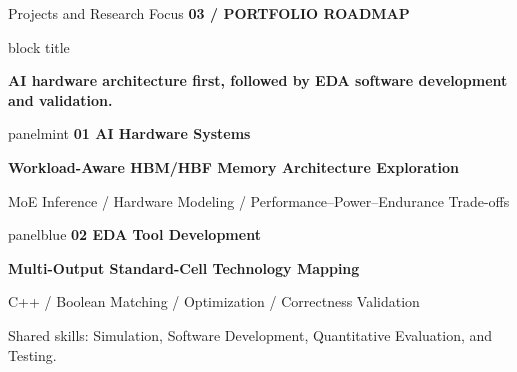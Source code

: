\documentclass[aspectratio=169,10pt]{beamer}
\newcommand{\smalllabel}[1]{{\scriptsize\bfseries\color{Accent}\MakeUppercase{#1}}}
\newcommand{\takeaway}[1]{%
  \begin{beamercolorbox}[rounded=true,sep=0.15cm,wd=\linewidth]{block title}%
    \strut\textbf{#1}\strut
  \end{beamercolorbox}}
\begin{document}
\begin{frame}{Projects and Research Focus}
  \vspace{0.03cm}
  \smalllabel{03 / Portfolio Roadmap}\par\vspace{0.10cm}
  \takeaway{AI hardware architecture first, followed by EDA software development and validation.}
  \vspace{0.16cm}
  \begin{beamercolorbox}[rounded=true,sep=0.15cm,wd=\linewidth]{panelmint}
    {\small\bfseries\color{Accent}01 \quad AI Hardware Systems}\par\vspace{0.02cm}
    {\normalsize\bfseries Workload-Aware HBM/HBF Memory Architecture Exploration}\par
    {\small MoE Inference / Hardware Modeling / Performance--Power--Endurance Trade-offs}
  \end{beamercolorbox}
  \vspace{0.14cm}
  \begin{beamercolorbox}[rounded=true,sep=0.15cm,wd=\linewidth]{panelblue}
    {\small\bfseries\color{AccentBlue}02 \quad EDA Tool Development}\par\vspace{0.02cm}
    {\normalsize\bfseries Multi-Output Standard-Cell Technology Mapping}\par
    {\small C++ / Boolean Matching / Optimization / Correctness Validation}
  \end{beamercolorbox}
  \vspace{0.14cm}
  {\small\color{Muted}Shared skills: Simulation, Software Development, Quantitative Evaluation, and Testing.}
\end{frame}
\end{document}
